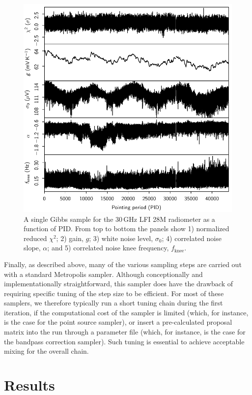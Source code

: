 \documentclass[twocolumn]{aa}
\begin{document}
\begin{figure}[t]
  \center
  \includegraphics[width=\linewidth]{figs/pidpar_BP10.pdf}
  \caption{A single Gibbs sample for the 30\,GHz LFI 28M radiometer as a
    function of PID. From top to bottom the panels show 1)
    normalized reduced $\chi^2$; 2) gain, $g$; 3) white noise level,
    $\sigma_0$; 4) correlated noise slope, $\alpha$; and 5) correlated
    noise knee frequency, $f_{\mathrm{knee}}$. }
  \label{fig:pidpar}
\end{figure}


Finally, as described above, many of the various sampling steps are
carried out with a standard Metropolis sampler. Although
conceptionally and implementationally straightforward, this sampler
does have the drawback of requiring specific tuning of the step size
to be efficient. For most of these samplers, we therefore typically
run a short tuning chain during the first iteration, if the
computational cost of the sampler is limited (which, for instance, is
the case for the point source sampler), or insert a pre-calculated
proposal matrix into the run through a parameter file (which, for
instance, is the case for the bandpass correction sampler). Such
tuning is essential to achieve acceptable mixing for the overall
chain.

\section{Results}
\label{sec:results}
\end{document}
